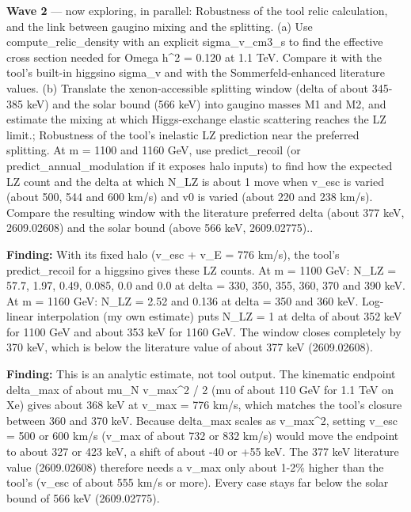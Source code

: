 \documentclass[11pt,a4paper]{article}
\begin{document}
\textbf{Wave 2} --- now exploring, in parallel: Robustness of the tool relic calculation, and the link between gaugino mixing and the splitting. (a) Use compute\_relic\_density with an explicit sigma\_v\_cm3\_s to find the effective cross section needed for Omega h\textasciicircum{}2 = 0.120 at 1.1 TeV. Compare it with the tool's built-in higgsino sigma\_v and with the Sommerfeld-enhanced literature values. (b) Translate the xenon-accessible splitting window (delta of about 345-385 keV) and the solar bound (566 keV) into gaugino masses M1 and M2, and estimate the mixing at which Higgs-exchange elastic scattering reaches the LZ limit.; Robustness of the tool's inelastic LZ prediction near the preferred splitting. At m = 1100 and 1160 GeV, use predict\_recoil (or predict\_annual\_modulation if it exposes halo inputs) to find how the expected LZ count and the delta at which N\_LZ is about 1 move when v\_esc is varied (about 500, 544 and 600 km/s) and v0 is varied (about 220 and 238 km/s). Compare the resulting window with the literature preferred delta (about 377 keV, 2609.02608) and the solar bound (above 566 keV, 2609.02775)..

\textbf{Finding:} With its fixed halo (v\_esc + v\_E = 776 km/s), the tool's predict\_recoil for a higgsino gives these LZ counts. At m = 1100 GeV: N\_LZ = 57.7, 1.97, 0.49, 0.085, 0.0 and 0.0 at delta = 330, 350, 355, 360, 370 and 390 keV. At m = 1160 GeV: N\_LZ = 2.52 and 0.136 at delta = 350 and 360 keV. Log-linear interpolation (my own estimate) puts N\_LZ = 1 at delta of about 352 keV for 1100 GeV and about 353 keV for 1160 GeV. The window closes completely by 370 keV, which is below the literature value of about 377 keV (2609.02608).

\textbf{Finding:} This is an analytic estimate, not tool output. The kinematic endpoint delta\_max of about mu\_N v\_max\textasciicircum{}2 / 2 (mu of about 110 GeV for 1.1 TeV on Xe) gives about 368 keV at v\_max = 776 km/s, which matches the tool's closure between 360 and 370 keV. Because delta\_max scales as v\_max\textasciicircum{}2, setting v\_esc = 500 or 600 km/s (v\_max of about 732 or 832 km/s) would move the endpoint to about 327 or 423 keV, a shift of about -40 or +55 keV. The 377 keV literature value (2609.02608) therefore needs a v\_max only about 1-2\% higher than the tool's (v\_esc of about 555 km/s or more). Every case stays far below the solar bound of 566 keV (2609.02775).
\end{document}
